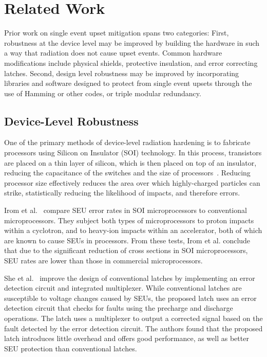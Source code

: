 \section{Related Work}\label{sec:related_work}

Prior work on single event upset mitigation spans two categories:
First, robustness at the device level may be improved by building the hardware in such a way that radiation does not cause upset events. 
Common hardware modifications include physical shields, protective insulation, and error correcting latches.
Second, design level robustness may be improved by incorporating libraries and software designed to protect from single event upsets through the use of Hamming or other codes, or triple modular redundancy.

\subsection{Device-Level Robustness}

One of the primary methods of device-level radiation hardening is to fabricate processors using Silicon on Insulator (SOI) technology.
In this process, transistors are placed on a thin layer of silicon, which is then placed on top of an insulator, reducing the capacitance of the switches and the size of processors~\cite{Celler2003SOI}.
Reducing processor size effectively reduces the area over which highly-charged particles can strike, statistically reducing the likelihood of impacts, and therefore errors.

Irom et al.~\cite{Irom2002SOI} compare SEU error rates in  SOI microprocessors to conventional microprocessors.
They subject both types of microprocessors to proton impacts within a cyclotron, and to heavy-ion impacts within an accelerator, both of which are known to cause SEUs in processors.
From these tests, Irom et al. conclude that due to the significant reduction of cross sections in SOI microprocessors, SEU rates are lower than those in commercial microprocessors.

She et al.~\cite{She2012Latch} improve the design of conventional latches by implementing an error detection circuit and integrated multiplexer.
While conventional latches are susceptible to voltage changes caused by SEUs, the proposed latch uses an error detection circuit that checks for faults using the precharge and discharge operations.
The latch uses a multiplexer to output a corrected signal based on the fault detected by the error detection circuit.
The authors found that the proposed latch introduces little overhead and offers good performance, as well as better SEU protection than conventional latches.

